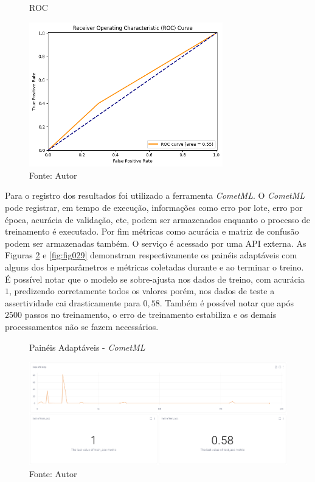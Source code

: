 \begin{figure}[h!]
    \centering
    \caption{ROC}
    \includegraphics[width=0.75\textwidth]{figures/fig017.png}
    \caption*{Fonte: Autor}
    \label{fig:fig017}
\end{figure}


Para o registro dos resultados foi utilizado a ferramenta \textit{CometML}. O \textit{CometML} pode registrar, em tempo de execução, informações como erro por lote, erro por época, acurácia de validação, etc, podem ser armazenados enquanto o processo de treinamento é executado. Por fim métricas como acurácia e matriz de confusão podem ser armazenadas também. O serviço é acessado  por uma \gls{API} externa. As Figuras \ref{fig:fig028} e \ref{fig:fig029} demonstram respectivamente os painéis adaptáveis com alguns dos hiperparâmetros e métricas coletadas durante e ao terminar o treino. É possível notar que o modelo se sobre-ajusta nos dados de treino, com acurácia $1$, predizendo corretamente todos os valores porém, nos dados de teste a assertividade cai drasticamente para $0,58$. Também é possível notar que após $2500$ passos no treinamento, o erro de treinamento estabiliza e os demais processamentos não se fazem necessários.

\begin{figure}[h!]
    \centering
    \caption{Painéis Adaptáveis - \textit{CometML}}
    \includegraphics[width=1\textwidth]{figures/fig028.png}
    \caption*{Fonte: Autor}
    \label{fig:fig028}
\end{figure}



